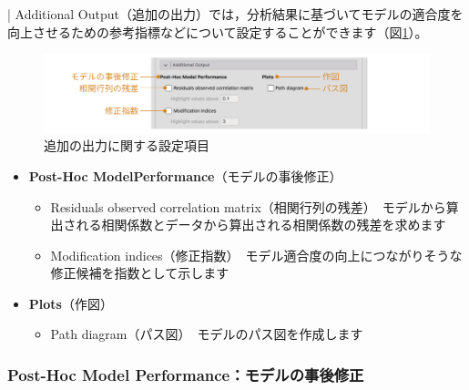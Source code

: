 \documentclass[
  12pt,
  a5jpaper,
  lualatex, ja=standard]{bxjsbook}
\providecommand{\tightlist}{%
  \setlength{\itemsep}{0pt}\setlength{\parskip}{0pt}}
\newenvironment{jmvsettings}{%
	\begin{center}%
	\begin{tcolorbox}[%
		title=設定項目,
		colframe=gmoji,
		colbacktitle=gmoji,
		colback=gmoji!2!white,
		breakable,
		width=.9\textwidth,
		]\small\addtolength{\leftmargini}{-3\labelsep}%
	}%
	{\end{tcolorbox}\end{center}}
\begin{document}
\colorbox{bar}{\textcolor{gmoji2}{| Additional Output}}（追加の出力）では，分析結果に基づいてモデルの適合度を向上させるための参考指標などについて設定することができます（図\ref{fig:factor-cfa-additional}）。

\begin{figure}[!ht]

{\centering \includegraphics[width=1\linewidth]{images/factor/cfa-additional} 

}

\caption{追加の出力に関する設定項目}\label{fig:factor-cfa-additional}
\end{figure}

\begin{jmvsettings}

\begin{itemize}
\tightlist
\item
  \textbf{Post-Hoc ModelPerformance}（モデルの事後修正）

  \begin{itemize}
  \tightlist
  \item
    Residuals observed correlation matrix（相関行列の残差）　モデルから算出される相関係数とデータから算出される相関係数の残差を求めます
  \item
    Modification indices（修正指数）　モデル適合度の向上につながりそうな修正候補を指数として示します
  \end{itemize}
\item
  \textbf{Plots}（作図）

  \begin{itemize}
  \tightlist
  \item
    Path diagram（パス図）　モデルのパス図を作成します
  \end{itemize}
\end{itemize}

\end{jmvsettings}

\hypertarget{subsub:factor-cfa-posthoc}{%
\subsubsection*{Post-Hoc Model Performance：モデルの事後修正}\label{subsub:factor-cfa-posthoc}}
\end{document}
